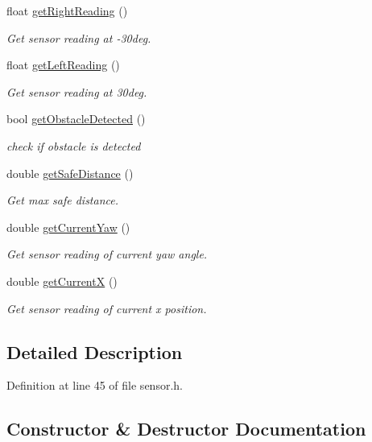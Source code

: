 \begin{DoxyCompactItemize}
float \mbox{\hyperlink{class_sensor_a784ee9b741908df505a51d0807dbbe9b}{get\+Right\+Reading}} ()
\begin{DoxyCompactList}\small\item\em Get sensor reading at -\/30deg. \end{DoxyCompactList}\item 
float \mbox{\hyperlink{class_sensor_a68826b1eb0dcda3a0508f213a42db25b}{get\+Left\+Reading}} ()
\begin{DoxyCompactList}\small\item\em Get sensor reading at 30deg. \end{DoxyCompactList}\item 
bool \mbox{\hyperlink{class_sensor_af590a94a155718952a71ee842a0db661}{get\+Obstacle\+Detected}} ()
\begin{DoxyCompactList}\small\item\em check if obstacle is detected \end{DoxyCompactList}\item 
double \mbox{\hyperlink{class_sensor_a1b7aad1c82fa6df205b166b311f45447}{get\+Safe\+Distance}} ()
\begin{DoxyCompactList}\small\item\em Get max safe distance. \end{DoxyCompactList}\item 
double \mbox{\hyperlink{class_sensor_a1984ff9826d1c92d7e91add776a4107b}{get\+Current\+Yaw}} ()
\begin{DoxyCompactList}\small\item\em Get sensor reading of current yaw angle. \end{DoxyCompactList}\item 
double \mbox{\hyperlink{class_sensor_a933dfb180d498c41862b5e14675cc97d}{get\+CurrentX}} ()
\begin{DoxyCompactList}\small\item\em Get sensor reading of current x position. \end{DoxyCompactList}\end{DoxyCompactItemize}


\subsection{Detailed Description}


Definition at line 45 of file sensor.\+h.



\subsection{Constructor \& Destructor Documentation}
\mbox{\label{class_sensor_a342d6d11ef572c8cba92cb76fb1a294b}} 
